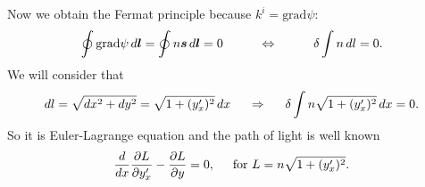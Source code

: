 Now we obtain the Fermat principle because $k^i = \text{grad} \psi$:
\begin{equation*}
	 \oint \text{grad} \psi \, d \mbox{\boldmath $l$} = \oint n \mbox{\boldmath $s$} \, d \mbox{\boldmath $l$} = 0 
	 \hspace{1 cm}
	\Leftrightarrow
	\hspace{1 cm}
	\delta \int n \, d l = 0.
\end{equation*}
We will consider that 
\begin{equation*}
	d l = \sqrt{ d x^2 + d y^2} = \sqrt{1 + (y_x')^2} \, d x
	\hspace{0.5 cm}
	\Rightarrow
	\hspace{0.5 cm}
	\delta \int n \sqrt{1 + (y_x')^2} \, d x = 0.
\end{equation*}
So it is Euler-Lagrange equation and the path of light is well known
\begin{equation*}
	\frac{d}{d x} \frac{\partial L}{\partial y_x'} - \frac{\partial L}{\partial y} = 0,
	\hspace{0.5 cm}
	\text{for } L = n \sqrt{1 + (y_x')^2}.
\end{equation*}